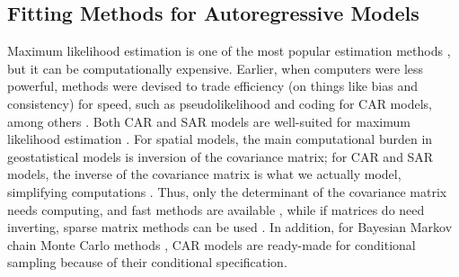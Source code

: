 \documentclass[11pt, titlepage]{article}\usepackage[]{graphicx}\usepackage[]{color}
\begin{document}
\begin{spacing}{1.9}
\begin{flushleft}
\subsection*{Fitting Methods for Autoregressive Models}

Maximum likelihood estimation is one of the most popular estimation methods \citep{Cres:stat:1993}, but it can be computationally expensive. Earlier, when computers were less powerful, methods were devised to trade efficiency (on things like bias and consistency) for speed, such as pseudolikelihood \citep{Besa:stat:1975} and coding \citep{Besa:spat:1974} for CAR models, among others \citep{Cres:stat:1993}.  Both CAR and SAR models are well-suited for maximum likelihood estimation \citep{Bane:Carl:Gelf:hier:2014}. For spatial models, the main computational burden in geostatistical models is inversion of the covariance matrix; for CAR and SAR models, the inverse of the covariance matrix is what we actually model, simplifying computations \citep{Paci:spat:2013}.  Thus, only the determinant of the covariance matrix needs computing, and fast methods are available \citep{ Pace:Barr:fast:1997, Pace:Barr:spar:1997}, while if matrices do need inverting, sparse matrix methods can be used \citep{Rue:Held:Gaus:2005}. In addition, for Bayesian Markov chain Monte Carlo methods \citep[MCMC;][]{Gelf:Smit:samp:1990}, CAR models are ready-made for conditional sampling because of their conditional specification.


\end{flushleft}
\end{spacing}
\end{document}

